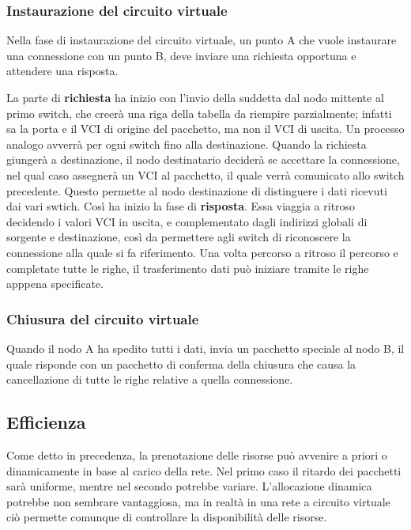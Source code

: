         \subsubsection{Instaurazione del circuito virtuale}
            Nella fase di instaurazione del circuito virtuale, un punto A che vuole instaurare una connessione con un punto B, deve inviare una richiesta opportuna e attendere una risposta.
            
            La parte di \textbf{richiesta} ha inizio con l'invio della suddetta dal nodo mittente al primo switch, che creerà una riga della tabella da riempire parzialmente; infatti sa la porta e il VCI di origine del pacchetto, ma non il VCI di uscita. Un processo analogo avverrà per ogni switch fino alla destinazione. Quando la richiesta giungerà a destinazione, il nodo destinatario deciderà se accettare la connessione, nel qual caso assegnerà un VCI al pacchetto, il quale verrà comunicato allo switch precedente. Questo permette al nodo destinazione di distinguere i dati ricevuti dai vari swtich. Così ha inizio la fase di \textbf{risposta}. Essa viaggia a ritroso decidendo i valori VCI in uscita, e complementato dagli indirizzi globali di sorgente e destinazione, così da permettere agli switch di riconoscere la connessione alla quale si fa riferimento. Una volta percorso a ritroso il percorso e completate tutte le righe, il trasferimento dati può iniziare tramite le righe apppena specificate.
            
        \subsubsection{Chiusura del circuito virtuale}
            Quando il nodo A ha spedito tutti i dati, invia un pacchetto speciale al nodo B, il quale risponde con un pacchetto di conferma della chiusura che causa la cancellazione di tutte le righe relative a quella connessione.
            
    \subsection{Efficienza}
        Come detto in precedenza, la prenotazione delle risorse può avvenire a priori o dinamicamente in base al carico della rete. Nel primo caso il ritardo dei pacchetti sarà uniforme, mentre nel secondo potrebbe variare. 
        L'allocazione dinamica potrebbe non sembrare vantaggiosa, ma in realtà in una rete a circuito virtuale ciò permette comunque di controllare la disponibilità delle risorse.
        
